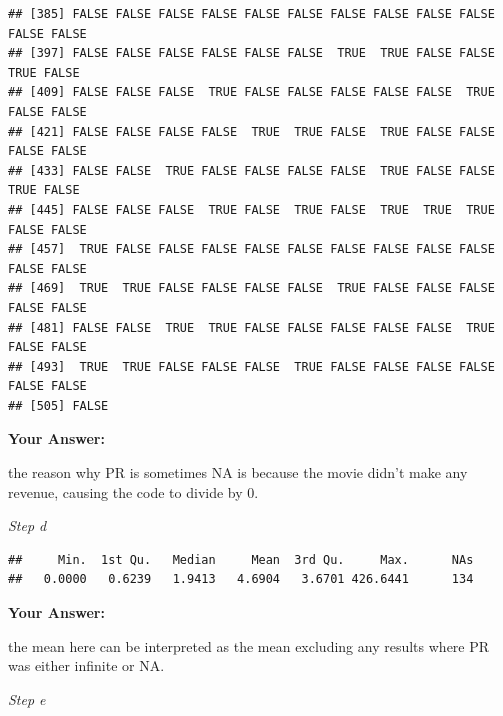 \documentclass[
]{article}
\newenvironment{Shaded}{\begin{snugshade}}{\end{snugshade}}
\newcommand{\CommentTok}[1]{\textcolor[rgb]{0.56,0.35,0.01}{\textit{#1}}}
\newcommand{\ConstantTok}[1]{\textcolor[rgb]{0.56,0.35,0.01}{#1}}
\newcommand{\ControlFlowTok}[1]{\textcolor[rgb]{0.13,0.29,0.53}{\textbf{#1}}}
\newcommand{\DecValTok}[1]{\textcolor[rgb]{0.00,0.00,0.81}{#1}}
\newcommand{\FunctionTok}[1]{\textcolor[rgb]{0.13,0.29,0.53}{\textbf{#1}}}
\newcommand{\NormalTok}[1]{#1}
\newcommand{\OtherTok}[1]{\textcolor[rgb]{0.56,0.35,0.01}{#1}}
\newcommand{\SpecialCharTok}[1]{\textcolor[rgb]{0.81,0.36,0.00}{\textbf{#1}}}
\begin{document}
\begin{verbatim}
## [385] FALSE FALSE FALSE FALSE FALSE FALSE FALSE FALSE FALSE FALSE FALSE FALSE
## [397] FALSE FALSE FALSE FALSE FALSE FALSE  TRUE  TRUE FALSE FALSE  TRUE FALSE
## [409] FALSE FALSE FALSE  TRUE FALSE FALSE FALSE FALSE FALSE  TRUE FALSE FALSE
## [421] FALSE FALSE FALSE FALSE  TRUE  TRUE FALSE  TRUE FALSE FALSE FALSE FALSE
## [433] FALSE FALSE  TRUE FALSE FALSE FALSE FALSE  TRUE FALSE FALSE  TRUE FALSE
## [445] FALSE FALSE FALSE  TRUE FALSE  TRUE FALSE  TRUE  TRUE  TRUE FALSE FALSE
## [457]  TRUE FALSE FALSE FALSE FALSE FALSE FALSE FALSE FALSE FALSE FALSE FALSE
## [469]  TRUE  TRUE FALSE FALSE FALSE FALSE  TRUE FALSE FALSE FALSE FALSE FALSE
## [481] FALSE FALSE  TRUE  TRUE FALSE FALSE FALSE FALSE FALSE  TRUE FALSE FALSE
## [493]  TRUE  TRUE FALSE FALSE FALSE  TRUE FALSE FALSE FALSE FALSE FALSE FALSE
## [505] FALSE
\end{verbatim}

\textbf{Your Answer:}

the reason why PR is sometimes NA is because the movie didn't make any
revenue, causing the code to divide by 0.

\emph{Step d}

\begin{Shaded}
\end{Shaded}

\begin{verbatim}
##     Min.  1st Qu.   Median     Mean  3rd Qu.     Max.      NAs 
##   0.0000   0.6239   1.9413   4.6904   3.6701 426.6441      134
\end{verbatim}

\textbf{Your Answer:}

the mean here can be interpreted as the mean excluding any results where
PR was either infinite or NA.

\emph{Step e}

\begin{Shaded}
\end{Shaded}
\end{document}
